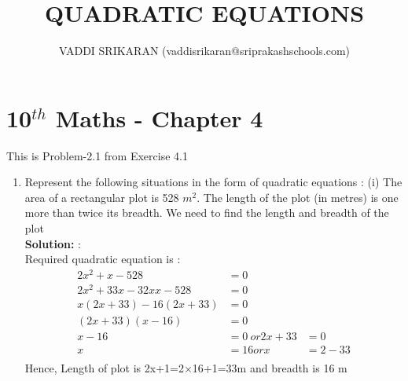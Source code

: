 \documentclass[12pt]{article}
\title{QUADRATIC EQUATIONS}
\author{VADDI SRIKARAN (vaddisrikaran@sriprakashschools.com)}
\newcommand{\solution}{\noindent \textbf{Solution: }}
\begin{document}
    \maketitle
    \section*{10$^{th}$ Maths - Chapter 4}
    This is Problem-2.1 from Exercise 4.1
    \begin{enumerate}
    \item Represent the following situations in the form of quadratic equations :
(i) The area of a rectangular plot is 528 $m^2$. The length of the plot (in metres) is one more than twice its breadth. We need to find the length and breadth of the plot\\
\solution:\\Required quadratic equation is :
\begin{align}
2x^2+x-528 &= 0\\
2x^2+33 x-32x x-528& = 0\\
x(2x+33)-16(2x+33)&=0\\
(2x+33)(x-16)&=0\\
x-16&=0\ or 2x+33&=0\\
x&=16 or x&=2-33\\
\end{align}
Hence, Length of plot is {2x+1=2×16+1=33m} and breadth is 16 m\\
\end{enumerate}
\end{document}
